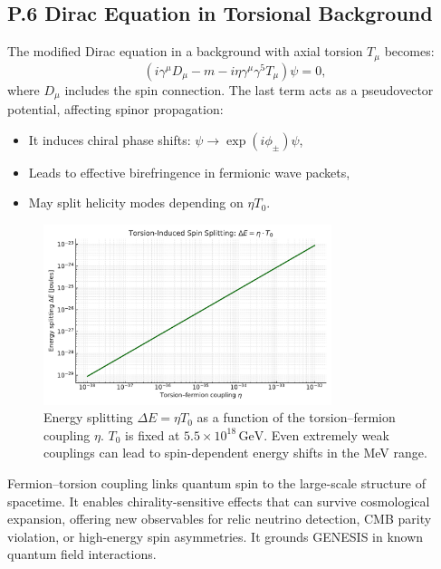 \documentclass{article}
\begin{document}
\subsection*{P.6 Dirac Equation in Torsional Background}
The modified Dirac equation in a background with axial torsion \(T_\mu\) becomes:
\begin{equation}
\left(i \gamma^\mu D_\mu - m - i \eta \gamma^\mu \gamma^5 T_\mu\right) \psi = 0,
\end{equation}
where \(D_\mu\) includes the spin connection. The last term acts as a pseudovector potential, affecting spinor propagation:
\begin{itemize}
  \item It induces chiral phase shifts: \(\psi \to \exp(i \phi_\pm) \psi\),
  \item Leads to effective birefringence in fermionic wave packets,
  \item May split helicity modes depending on \(\eta T_0\).
\end{itemize}

\begin{figure}[h!]
\centering
\includegraphics[width=0.75\textwidth]{Spin_Splitting_vs_Eta.pdf}
\caption{Energy splitting \(\Delta E = \eta T_0\) as a function of the torsion–fermion coupling \(\eta\). \(T_0\) is fixed at \(5.5 \times 10^{18}\,\mathrm{GeV}\). Even extremely weak couplings can lead to spin-dependent energy shifts in the MeV range.}
\label{fig:spin_splitting}
\end{figure}

\begin{tcolorbox}[colback=gray!5, colframe=black!30, title=Why this matters]
Fermion–torsion coupling links quantum spin to the large-scale structure of spacetime. It enables chirality-sensitive effects that can survive cosmological expansion, offering new observables for relic neutrino detection, CMB parity violation, or high-energy spin asymmetries. It grounds GENESIS in known quantum field interactions.
\end{tcolorbox}
\end{document}
